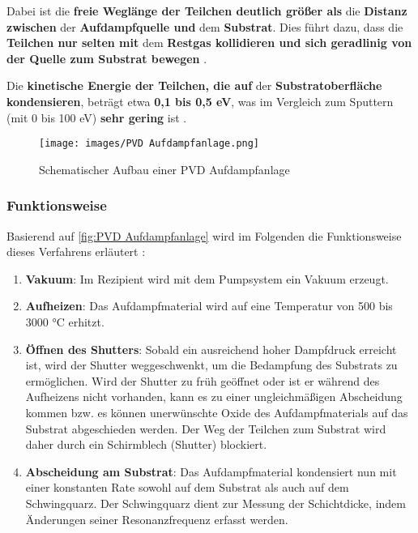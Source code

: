 \documentclass{article} %
\begin{document}
\vspace{1em}

Dabei ist die \textbf{freie Weglänge der Teilchen deutlich größer als} die \textbf{Distanz zwischen} der \textbf{Aufdampfquelle und} dem 
\textbf{Substrat}. Dies führt dazu, dass die \textbf{Teilchen nur selten mit} dem \textbf{Restgas kollidieren und sich geradlinig von der Quelle 
zum Substrat bewegen} \cite{keplinger2024}.

\vspace{1em}

Die \textbf{kinetische Energie der Teilchen, die auf} der \textbf{Substratoberfläche kondensieren}, beträgt etwa \textbf{0,1 bis 0,5 eV}, was im 
Vergleich zum Sputtern (mit 0 bis 100 eV) \textbf{sehr gering} ist \cite{keplinger2024}.

\vspace{2em}

\begin{figure}[ht]
    \centering
    \texttt{[image: images/PVD Aufdampfanlage.png]} %
    \captionsetup{labelfont=bf} %
    \caption{Schematischer Aufbau einer PVD Aufdampfanlage \cite{keplinger2024}}
    \label{fig:PVD Aufdampfanlage}
\end{figure}

\vspace{1em}
\subsubsection{Funktionsweise}
Basierend auf \autoref{fig:PVD Aufdampfanlage} wird im Folgenden die Funktionsweise dieses Verfahrens erläutert \cite{keplinger2024}:

\begin{enumerate}
    \item \textbf{Vakuum}: Im Rezipient wird mit dem Pumpsystem ein Vakuum erzeugt.
    \item \textbf{Aufheizen}: Das Aufdampfmaterial wird auf eine Temperatur von 500 bis 3000 °C erhitzt.
    \item \textbf{Öffnen des Shutters}: Sobald ein ausreichend hoher Dampfdruck erreicht ist, wird der Shutter weggeschwenkt, um die Bedampfung 
    des Substrats zu ermöglichen. Wird der Shutter zu früh geöffnet oder ist er während des Aufheizens nicht vorhanden, kann es zu einer 
    ungleichmäßigen Abscheidung kommen bzw. es können unerwünschte Oxide des Aufdampfmaterials auf das Substrat abgeschieden werden. Der Weg der
     Teilchen zum Substrat wird daher durch ein Schirmblech (Shutter) blockiert.
    \item \textbf{Abscheidung am Substrat}: Das Aufdampfmaterial kondensiert nun mit einer konstanten Rate sowohl auf dem Substrat als auch auf 
    dem Schwingquarz. Der Schwingquarz dient zur Messung der Schichtdicke, indem Änderungen seiner Resonanzfrequenz erfasst werden.
\end{enumerate}
\end{document}
